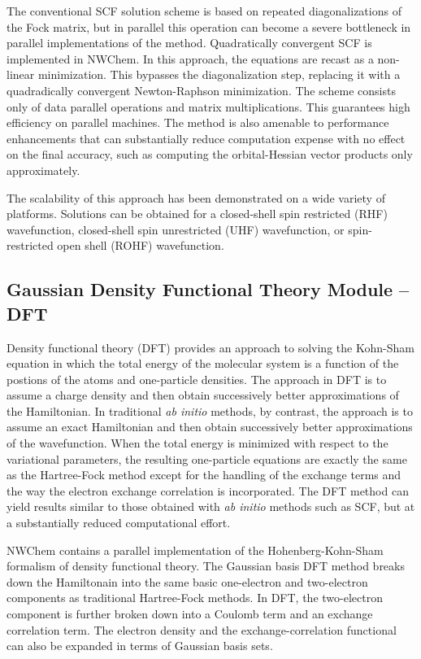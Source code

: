 The conventional SCF solution scheme is based on repeated diagonalizations of
the Fock matrix, but in parallel this operation can become a severe bottleneck
in parallel implementations of the method.  Quadratically convergent SCF is 
implemented in NWChem.  In this approach, the
equations are recast as a non-linear minimization.  This bypasses the
diagonalization step, replacing it with a quadradically convergent 
Newton-Raphson minimization.  The scheme consists only of data parallel operations
and matrix multiplications.  This guarantees high efficiency on parallel
machines.  The method is also amenable to performance enhancements that can
substantially reduce computation expense with no effect on the final
accuracy, such as computing the orbital-Hessian vector products only approximately.

The scalability of this approach has been demonstrated on a wide variety
of platforms.
Solutions can be obtained for a closed-shell spin restricted (RHF) wavefunction,
closed-shell spin unrestricted (UHF) wavefunction, or spin-restricted open
shell (ROHF) wavefunction.

\subsection{Gaussian Density Functional Theory Module -- DFT}

Density functional theory (DFT) provides an approach to solving the Kohn-Sham 
equation in which the total energy of the molecular system is a function
of the postions of the atoms and one-particle densities.
The approach in DFT is to assume
a charge density and then obtain
successively better approximations of the Hamiltonian.  In traditional
{\em ab initio} methods, by contrast, the approach is to assume an exact 
Hamiltonian and then obtain 
successively better approximations of the wavefunction.
When the total
energy is minimized with respect to the variational parameters, the resulting
one-particle equations are exactly the same as the Hartree-Fock method except
for the handling of the exchange terms and the way the electron
exchange correlation is incorporated.  The DFT method can yield results
similar to those obtained with {\em ab initio} methods such as SCF, but 
at a substantially reduced computational effort.

NWChem contains a parallel implementation of the Hohenberg-Kohn-Sham formalism
of density functional theory.
The Gaussian basis DFT method breaks down the Hamiltonain into the same
basic one-electron and two-electron components as traditional Hartree-Fock
methods.  In DFT, the two-electron component is
further broken down into a Coulomb term and an exchange correlation term.
The electron density and the exchange-correlation functional can also be
expanded in terms of Gaussian basis sets.


